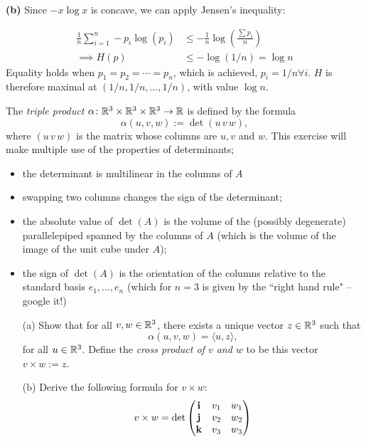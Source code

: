\documentclass[a4paper, 12pt]{article}
\begin{document}
\begin{solution}
    \textbf{(b)} Since $-x \log x$ is concave, we can apply Jensen's inequality:

    \begin{align*}
        \frac{1}{n} \sum_{i=1}^{n} -p_i \log (p_i) & \leq -\frac{1}{n} \log\left(\frac{\sum p_i}{n}\right) \\
        \implies H(p)                              & \leq - \log(1/n) = \log n
    \end{align*}
    Equality holds when $p_1 = p_2 = \cdots = p_n$, which is achieved, $p_i = 1/n \forall i$. $H$ is therefore maximal at $(1/n, 1/n, \ldots, 1/n)$, with value $\log n$.
\end{solution}

\begin{problem} 
The {\em triple product} $\alpha\colon \mathbb{R}^3\times\mathbb{R}^3\times\mathbb{R}^3\to \mathbb{R}$ is defined by the formula
\[\alpha(u,v,w) := \det( u \, v \, w),
\]
where $(u\,  v\,  w)$ is the matrix whose columns are $u, v$ and $w$.   This exercise  will make multiple use of the properties of determinants;
\begin{itemize}
    \item the determinant is multilinear in the columns of $A$
    \item swapping two columns changes the sign of the determinant;
    \item the absolute value of $\det(A)$  is the volume of the (possibly degenerate) parallelepiped spanned by the columns of $A$  (which is the volume of the image of the unit cube under $A$);
    \item the sign of $\det(A)$  is the orientation of the columns relative to the standard basis $e_1, \ldots, e_n$ (which for $n=3$ is given by the ``right hand rule" -- google it!)
\end{itemize}
\begin{enumerate}
    \item[(a)]  Show that for all $v,w\in \mathbb{R}^3$, there exists a unique vector $z\in\mathbb{R}^3$ such that
        \[\alpha(u,v,w) = \langle u, z \rangle,
        \]
        for all $u\in \mathbb{R}^3$.  Define the {\em cross product of $v$ and $w$} to be this vector $v\times w:= z$.
    \item[(b)] Derive the following formula for $v\times w$:
        \[v\times w = \det \begin{pmatrix} {\bf i} & v_1 & w_1 \\
                {\bf j} & v_2 & w_2 \\
                {\bf k} & v_3 & w_3 \\

\end{pmatrix}\]
\end{enumerate}
\end{problem}
\end{document}

